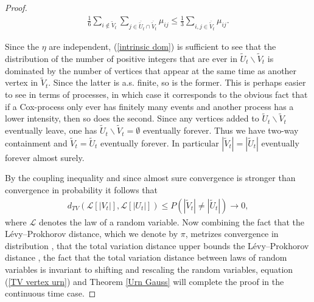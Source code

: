 \documentclass[12pt]{article}
\theoremstyle{definition}
\begin{document}
\begin{proof}
\begin{align}\label{intrinsic dom}\frac{1}{6}\sum_{i \notin \tilde{V}_t} \sum_{j \in \overline{\tilde{U}}_t \cap \overline{\tilde{V}}_t}\mu_{ij} \leq \frac{1}{3}\sum_{i,j \in \overline{\tilde{V}}_t}\mu_{ij}.\end{align}


Since the $\eta$ are independent, (\ref{intrinsic dom}) is sufficient to see that the distribution of the number of positive integers that are ever in $\tilde{U}_t \backslash \tilde{V}_t$ is dominated by the number of vertices that appear at the same time as another vertex in $\tilde{V}_t$. Since the latter is a.s. finite, so is the former. This is perhaps easier to see in terms of processes, in which case it corresponds to the obvious fact that if a Cox-process only ever has finitely many events and another process has a lower intensity, then so does the second. Since any vertices added to $\tilde{U}_t \backslash \tilde{V}_t$ eventually leave, one has $\tilde{U}_t \backslash \tilde{V}_t = \emptyset$ eventually forever. Thus we have two-way containment and $\tilde{V}_t = \tilde{U}_t$ eventually forever. In particular $|\tilde{V}_t|=|\tilde{U}_t|$ eventually forever almost surely.

By the coupling inequality and since almost sure convergence is stronger than convergence in probability it follows that 
\begin{align}\label{TV vertex urn} d_{TV}(\mathcal{L}[|V_t|],\mathcal{L}[|U_t|]) \leq P(|\tilde{V}_t| \neq |\tilde{U}_t|) \rightarrow 0,\end{align} where $\mathcal{L}$ denotes the law of a random variable. Now combining the fact that the Lévy–Prokhorov distance, which we denote by $\pi$, metrizes convergence in distribution \cite{gibbs_2002_on}, that the total variation distance upper bounds the Lévy–Prokhorov distance \cite{gibbs_2002_on}, the fact that the total variation distance between laws of random variables is invariant to shifting and rescaling the random variables, equation (\ref{TV vertex urn}) and Theorem \ref{Urn Gauss} will complete the proof in the continuous time case.


\end{proof}
\end{document}
